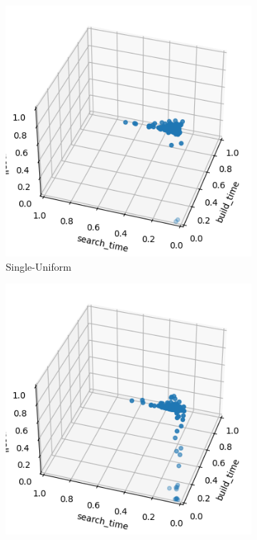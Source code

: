 \begin{figure}[ht]
    \centering
    \hfill
    \begin{subfigure}{0.24\textwidth}
        \includegraphics[width=\textwidth]{../images/report/scaling-frontier-single-unif.png}
        \caption{Single-Uniform}
    \end{subfigure}
    \hfill
    \begin{subfigure}{0.24\textwidth}
        \includegraphics[width=\textwidth]{../images/report/scaling-frontier-single-tour.png}

\end{subfigure}
\end{figure}
